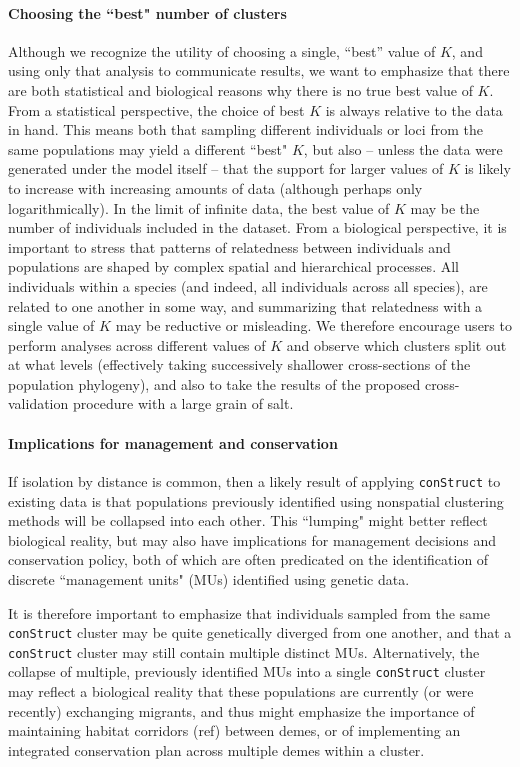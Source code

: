 \documentclass[12pt]{article}
\begin{document}
\paragraph{Choosing the ``best" number of clusters}
Although we recognize the utility of choosing a single, ``best'' value of $K$, 
and using only that analysis to communicate results, 
we want to emphasize that there are both statistical and biological reasons 
why there is no true best value of $K$.
From a statistical perspective, the choice of best $K$ is always relative to the data in hand.
This means both that sampling different individuals or loci 
from the same populations may yield a different ``best" $K$, 
but also 
-- unless the data were generated under the model itself --
that the support for larger values of $K$ is likely to increase with increasing amounts of data
(although perhaps only logarithmically).
In the limit of infinite data, the best value of $K$ 
may be the number of individuals included in the dataset.
From a biological perspective, 
it is important to stress that patterns of relatedness between individuals and populations 
are shaped by complex spatial and hierarchical processes.
All individuals within a species (and indeed, all individuals across all species), 
are related to one another in some way, 
and summarizing that relatedness with a single value of $K$ may be reductive or misleading.
We therefore encourage users to perform analyses across different values of $K$ and 
observe which clusters split out at what levels 
(effectively taking successively shallower cross-sections of the population phylogeny),
and also to take the results of the proposed cross-validation procedure with a large grain of salt.

\paragraph{Implications for management and conservation}
If isolation by distance is common, 
then a likely result of applying \texttt{conStruct} to existing data is that 
populations previously identified using nonspatial clustering methods 
will be collapsed into each other.  
This ``lumping" might better reflect biological reality, 
but may also have implications for management decisions and conservation policy, 
both of which are often predicated on the identification of discrete ``management units" (MUs) 
identified using genetic data.

It is therefore important to emphasize that individuals sampled from the same \texttt{conStruct} cluster 
may be quite genetically diverged from one another, 
and that a \texttt{conStruct} cluster may still contain multiple distinct MUs.  
Alternatively, the collapse of multiple, previously identified MUs into a single \texttt{conStruct} cluster 
may reflect a biological reality that these populations are currently 
(or were recently) exchanging migrants, 
and thus might emphasize the importance of maintaining habitat corridors (ref) 
between demes, or of implementing an integrated conservation plan across multiple demes within a cluster.
\end{document}
